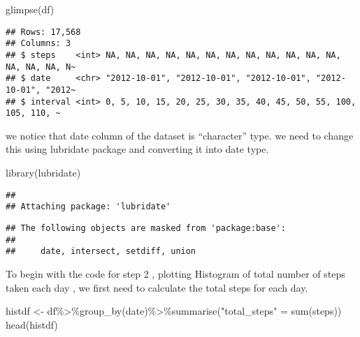 \documentclass[
]{article}
\newenvironment{Shaded}{\begin{snugshade}}{\end{snugshade}}
\newcommand{\FunctionTok}[1]{\textcolor[rgb]{0.00,0.00,0.00}{#1}}
\newcommand{\NormalTok}[1]{#1}
\newcommand{\OtherTok}[1]{\textcolor[rgb]{0.56,0.35,0.01}{#1}}
\newcommand{\SpecialCharTok}[1]{\textcolor[rgb]{0.00,0.00,0.00}{#1}}
\newcommand{\StringTok}[1]{\textcolor[rgb]{0.31,0.60,0.02}{#1}}
\begin{document}
\begin{Shaded}
\begin{Highlighting}[]
\FunctionTok{glimpse}\NormalTok{(df)}
\end{Highlighting}
\end{Shaded}

\begin{verbatim}
## Rows: 17,568
## Columns: 3
## $ steps    <int> NA, NA, NA, NA, NA, NA, NA, NA, NA, NA, NA, NA, NA, NA, NA, N~
## $ date     <chr> "2012-10-01", "2012-10-01", "2012-10-01", "2012-10-01", "2012~
## $ interval <int> 0, 5, 10, 15, 20, 25, 30, 35, 40, 45, 50, 55, 100, 105, 110, ~
\end{verbatim}

we notice that date column of the dataset is ``character'' type. we need
to change this using lubridate package and converting it into date type.

\begin{Shaded}
\begin{Highlighting}[]
\FunctionTok{library}\NormalTok{(lubridate)}
\end{Highlighting}
\end{Shaded}

\begin{verbatim}
## 
## Attaching package: 'lubridate'
\end{verbatim}

\begin{verbatim}
## The following objects are masked from 'package:base':
## 
##     date, intersect, setdiff, union
\end{verbatim}

\begin{Shaded}
\end{Shaded}

To begin with the code for step 2 , plotting Histogram of total number
of steps taken each day , we first need to calculate the total steps for
each day.

\begin{Shaded}
\begin{Highlighting}[]
\NormalTok{histdf }\OtherTok{\textless{}{-}}\NormalTok{ df}\SpecialCharTok{\%\textgreater{}\%}\FunctionTok{group\_by}\NormalTok{(date)}\SpecialCharTok{\%\textgreater{}\%}\FunctionTok{summarise}\NormalTok{(}\StringTok{"total\_steps"} \OtherTok{=} \FunctionTok{sum}\NormalTok{(steps))}
\FunctionTok{head}\NormalTok{(histdf)}
\end{Highlighting}
\end{Shaded}
\end{document}
